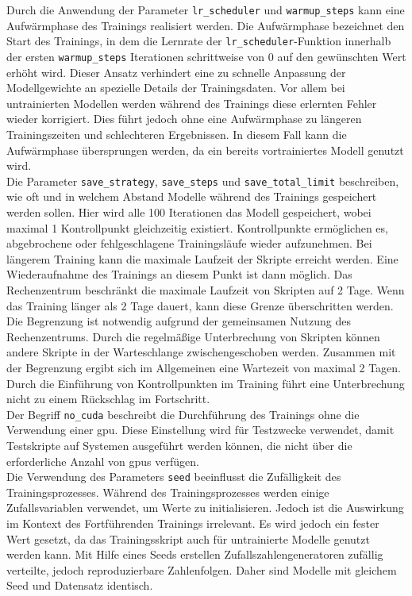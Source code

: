 Durch die Anwendung der Parameter \texttt{lr\_scheduler} und \texttt{warmup\_\allowbreak{}steps} kann eine Aufwärmphase des Trainings realisiert werden.
Die Aufwärmphase bezeichnet den Start des Trainings, in dem die Lernrate der \texttt{lr\_scheduler}-Funktion innerhalb der ersten \texttt{warmup\_steps} Iterationen schrittweise von $0$ auf den gewünschten Wert erhöht wird.
Dieser Ansatz verhindert eine zu schnelle Anpassung der Modellgewichte an spezielle Details der Trainingsdaten.
Vor allem bei untrainierten Modellen werden während des Trainings diese erlernten Fehler wieder korrigiert. Dies führt jedoch ohne eine Aufwärmphase zu längeren Trainingszeiten und schlechteren Ergebnissen.
In diesem Fall kann die Aufwärmphase übersprungen werden, da ein bereits vortrainiertes Modell genutzt wird.\\

Die Parameter \texttt{save\_strategy}, \texttt{save\_steps} und \texttt{save\_total\_limit} beschreiben, wie oft und in welchem Abstand Modelle während des Trainings gespeichert werden sollen.
Hier wird alle 100 Iterationen das Modell gespeichert, wobei maximal 1 Kontrollpunkt gleichzeitig existiert.
Kontrollpunkte ermöglichen es, abgebrochene oder fehlgeschlagene Trainingsläufe wieder aufzunehmen.
Bei längerem Training kann die maximale Laufzeit der Skripte erreicht werden.
Eine Wiederaufnahme des Trainings an diesem Punkt ist dann möglich.
Das Rechenzentrum beschränkt die maximale Laufzeit von Skripten auf 2 Tage.
Wenn das Training länger als 2 Tage dauert, kann diese Grenze überschritten werden.
Die Begrenzung ist notwendig aufgrund der gemeinsamen Nutzung des Rechenzentrums.
Durch die regelmäßige Unterbrechung von Skripten können andere Skripte in der Warteschlange zwischengeschoben werden.
Zusammen mit der Begrenzung ergibt sich im Allgemeinen eine Wartezeit von maximal 2 Tagen.
Durch die Einführung von Kontrollpunkten im Training führt eine Unterbrechung nicht zu einem Rückschlag im Fortschritt.\\

Der Begriff \texttt{no\_cuda} beschreibt die Durchführung des Trainings ohne die Verwendung einer \ac{gpu}.
Diese Einstellung wird für Testzwecke verwendet, damit Testskripte auf Systemen ausgeführt werden können, die nicht über die erforderliche Anzahl von \ac{gpu}s verfügen.\\

Die Verwendung des Parameters \texttt{seed} beeinflusst die Zufälligkeit des Trainingsprozesses.
Während des Trainingsprozesses werden einige Zufallsvariablen verwendet, um Werte zu initialisieren.
Jedoch ist die Auswirkung im Kontext des Fortführenden Trainings irrelevant.
Es wird jedoch ein fester Wert gesetzt, da das Trainingsskript auch für untrainierte Modelle genutzt werden kann.
Mit Hilfe eines Seeds erstellen Zufallszahlengeneratoren zufällig verteilte, jedoch reproduzierbare Zahlenfolgen.
Daher sind Modelle mit gleichem Seed und Datensatz identisch.\\


